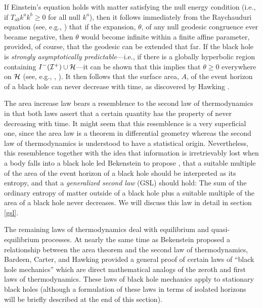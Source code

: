 If Einstein's equation holds with matter satisfying the null energy
condition (i.e., if $T_{ab} k^a k^b \geq 0$ for all null $k^a$), then
it follows immediately from the Raychauduri equation (see, e.g.,
\cite{w3}) that if the expansion, $\theta$, of any null geodesic
congruence ever became negative, then $\theta$ would become infinite
within a finite affine parameter, provided, of course, that the
geodesic can be extended that far. If the black hole is {\it strongly
asymptotically predictable}---i.e., if there is a globally hyperbolic
region containing $I^-({\cal I}^+) \cup {\cal H}$---it can be shown
that this implies that $\theta \geq 0$ everywhere on $\cal H$ (see,
e.g., \cite{he}, \cite{w3}). It then follows that the surface area,
$A$, of the event horizon of a black hole can never decrease with
time, as discovered by Hawking \cite{h}.

The area increase law bears a resemblence to the second law of
thermodynamics in that both laws assert that a certain quantity has
the property of never decreasing with time. It might seem that this
resemblence is a very superficial one, since the area law is a theorem
in differential geometry whereas the second law of thermodynamics is
understood to have a statistical origin. Nevertheless, this
resemblence together with the idea that information is irretrievably
lost when a body falls into a black hole led Bekenstein to propose
\cite{b1}, \cite{b2} that a suitable multiple of the area of the event
horizon of a black hole should be interpreted as its entropy, and that
a {\it generalized second law} (GSL) should hold: The sum of the
ordinary entropy of matter outside of a black hole plus a suitable
multiple of the area of a black hole never decreases. We will discuss
this law in detail in section \ref{gsl}.

The remaining laws of thermodynamics deal with equilibrium and
quasi-equilibrium processes. At nearly the same time as Bekenstein
proposed a relationship between the area theorem and the second law of
thermodynamics, Bardeen, Carter, and Hawking \cite{bch} provided a
general proof of certain laws of ``black hole mechanics'' which are
direct mathematical analogs of the zeroth and first laws of
thermodynamics. These laws of black hole mechanics apply to stationary
black holes (although a formulation of these laws in terms of isolated
horizons will be briefly described at the end of this section).

